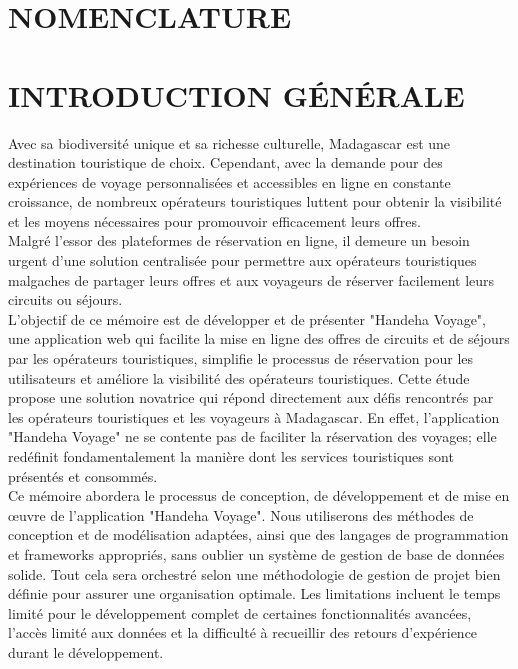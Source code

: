 \documentclass[12pt]{report}
\begin{document}
			\chapter*{NOMENCLATURE}
			\newpage
			\setcounter{page}{1}
			\chapter*{INTRODUCTION GÉNÉRALE}
			\begin{center}
				\begin{minipage}{\textwidth}
					\hspace{15pt} Avec sa biodiversité unique et sa richesse culturelle, Madagascar est une destination touristique de choix. Cependant, avec la demande pour des expériences de voyage personnalisées et accessibles en ligne en constante croissance, de nombreux opérateurs touristiques luttent pour obtenir la visibilité et les moyens nécessaires pour promouvoir efficacement leurs offres.\\
	
					\hspace{15pt} Malgré l'essor des plateformes de réservation en ligne, il demeure un besoin urgent d'une solution centralisée pour permettre aux opérateurs touristiques malgaches de partager leurs offres et aux voyageurs de réserver facilement leurs circuits ou séjours.\\
	
					\hspace{15pt} L'objectif de ce mémoire est de développer et de présenter "Handeha Voyage", une application web qui  facilite la mise en ligne des offres de circuits et de séjours par les opérateurs touristiques, simplifie le processus de réservation pour les utilisateurs et améliore la visibilité des opérateurs touristiques. Cette étude propose une solution novatrice qui répond directement aux défis rencontrés par les opérateurs touristiques et les voyageurs à Madagascar. En effet, l'application "Handeha Voyage" ne se contente pas de faciliter la réservation des voyages; elle redéfinit fondamentalement la manière dont les services touristiques sont présentés et consommés.\\
	
					\hspace{15pt} Ce mémoire abordera le processus de conception, de développement et de mise en œuvre de l'application "Handeha Voyage". Nous utiliserons des méthodes de conception et de modélisation adaptées, ainsi que des langages de programmation et frameworks appropriés, sans oublier un système de gestion de base de données solide. Tout cela sera orchestré selon une méthodologie de gestion de projet bien définie pour assurer une organisation optimale. Les limitations incluent le temps limité pour le développement complet de certaines fonctionnalités avancées, l'accès limité aux données et la difficulté à recueillir des retours d'expérience durant le développement.\\
	

\end{minipage}
\end{center}
\end{document}
